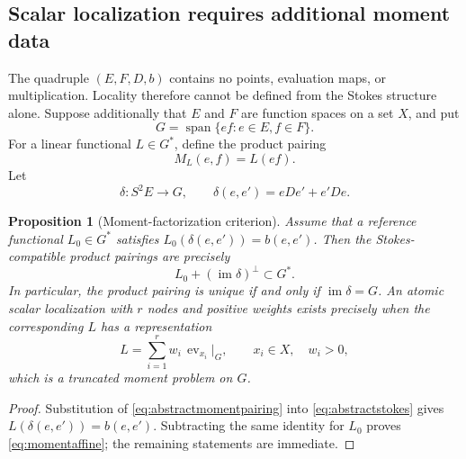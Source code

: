 \documentclass[11pt,a4paper]{article}
\newtheorem{proposition}[theorem]{Proposition}
\theoremstyle{definition}
\theoremstyle{remark}
\newcommand{\im}{\operatorname{im}}
\newcommand{\spanof}{\operatorname{span}}
\begin{document}
\subsection{Scalar localization requires additional moment data}

The quadruple $(E,F,D,b)$ contains no points, evaluation maps, or multiplication.  Locality
therefore cannot be defined from the Stokes structure alone.  Suppose additionally that
$E$ and $F$ are function spaces on a set $X$, and put
\[
 G=\spanof\{ef:e\in E, f\in F\}.
\]
For a linear functional $L\in G^*$, define the product pairing
\begin{equation}\label{eq:abstractmomentpairing}
 M_L(e,f)=L(ef).
\end{equation}
Let
\begin{equation}\label{eq:deltadefinition}
 \delta:S^2E\longrightarrow G,
 \qquad \delta(e,e')=eDe'+e'De.
\end{equation}

\begin{proposition}[Moment-factorization criterion]\label{prop:momentfactorization}
Assume that a reference functional $L_0\in G^*$ satisfies
$L_0(\delta(e,e'))=b(e,e')$.  Then the Stokes-compatible product pairings are precisely
\begin{equation}\label{eq:momentaffine}
 L_0+(\im\delta)^\perp\subset G^*.
\end{equation}
In particular, the product pairing is unique if and only if $\im\delta=G$.
An atomic scalar localization with $r$ nodes and positive weights exists precisely when the
corresponding $L$ has a representation
\begin{equation}\label{eq:atomicmoment}
 L=\sum_{i=1}^r w_i\,\operatorname{ev}_{x_i}|_G,
 \qquad x_i\in X,\quad w_i>0,
\end{equation}
which is a truncated moment problem on $G$.
\end{proposition}

\begin{proof}
Substitution of \eqref{eq:abstractmomentpairing} into \eqref{eq:abstractstokes} gives
$L(\delta(e,e'))=b(e,e')$.  Subtracting the same identity for $L_0$ proves
\eqref{eq:momentaffine}; the remaining statements are immediate.
\end{proof}
\end{document}
